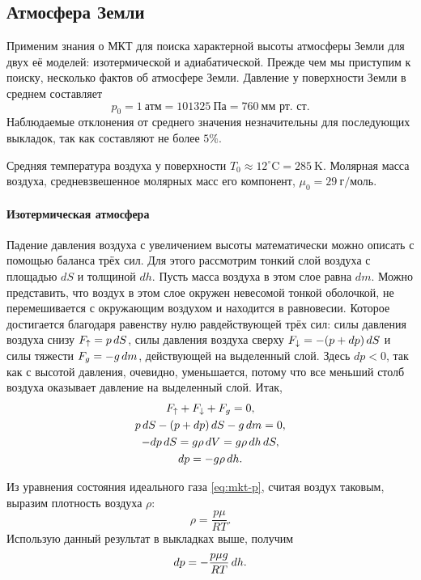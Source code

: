 \subsection{Атмосфера Земли}
Применим знания о МКТ для поиска характерной высоты атмосферы Земли для двух её моделей: изотермической и адиабатической. Прежде чем мы приступим к поиску, несколько фактов об атмосфере Земли. Давление у поверхности Земли в среднем составляет 
\begin{equation*}
	p_0 = 1~\text{атм} = 101325~\text{Па} = 760~\text{мм рт. ст}.
\end{equation*}
Наблюдаемые отклонения от среднего значения незначительны для последующих выкладок, так как составляют не более $5\%$. 

Средняя температура воздуха у поверхности $T_0 \approx 12^\circ\text{C} = 285~\text{K}$. Молярная масса воздуха, средневзвешенное молярных масс его компонент, $\mu_0 = 29~\text{г}/\text{моль}$. 

\paragraph{Изотермическая атмосфера} Падение давления воздуха с увеличением высоты математически можно описать с помощью баланса трёх сил. Для этого рассмотрим тонкий слой воздуха с площадью $dS$ и толщиной $dh$. Пусть масса воздуха в этом слое равна $dm$. Можно представить, что воздух в этом слое окружен невесомой тонкой оболочкой, не перемешивается с окружающим воздухом и находится в равновесии. Которое достигается благодаря равенству нулю равдействующей трёх сил: силы давления воздуха снизу $F_\uparrow = p\,d S$, силы давления воздуха сверху $F_\downarrow = -(p + dp)\,d S$ и силы тяжести $F_g = -g\,d m$, действующей на выделенный слой. Здесь $dp < 0$, так как с высотой давления, очевидно, уменьшается, потому что все меньший столб воздуха оказывает давление на выделенный слой. Итак,
\begin{gather*}
	F_\uparrow + F_\downarrow + F_g = 0,\\
	p \,d S - (p + dp) \,d S - g \,d m = 0,\\
	- dp\,d S = g \rho \,d V = g \rho \,d h \,d S,\\
	dp = - g \rho \,d h.
\end{gather*}

Из уравнения состояния идеального газа \eqref{eq:mkt-p}, считая воздух таковым, выразим плотность воздуха $\rho$:
\begin{equation*}
	\rho = \frac{p \mu}{RT}.
\end{equation*}
Использую данный результат в выкладках выше, получим
\begin{equation}
	dp = - \frac{p \mu g}{RT} \,d h.
	\label{eq:earth-atm-dp}
\end{equation}

